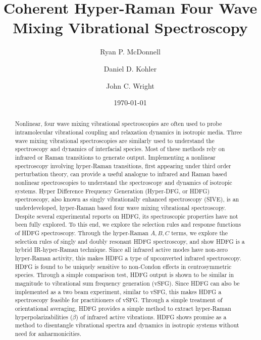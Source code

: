 \documentclass[aip, jcp, reprint, onecolumn]{revtex4-2}
\begin{document}
\title{Coherent Hyper-Raman Four Wave Mixing Vibrational Spectroscopy}


\author{Ryan P. McDonnell} 
\author{Daniel D. Kohler}
\author{John C. Wright} 


\date{\today}

\begin{abstract}
Nonlinear, four wave mixing vibrational spectroscopies are often used to probe intramolecular vibrational coupling and relaxation dynamics in isotropic media.
Three wave mixing vibrational spectroscopies are similarly used to understand the spectroscopy and dynamics of interfacial species.
Most of these methods rely on infrared or Raman transitions to generate output. 
Implementing a nonlinear spectroscopy involving hyper-Raman transitions, first appearing under third order perturbation theory, can provide a useful analogue to infrared and Raman based nonlinear spectroscopies to understand the spectroscopy and dynamics of isotropic systems.
Hyper Difference Frequency Generation (Hyper-DFG, or HDFG) spectroscopy, also known as singly vibrationally enhanced spectroscopy (SIVE), is an underdeveloped, hyper-Raman based four wave mixing vibrational spectroscopy. 
Despite several experimental reports on HDFG, its spectroscopic properties have not been fully explored.
To this end, we explore the selection rules and response functions of HDFG spectroscopy.
Through the hyper-Raman $A,B,C$ terms, we explore the selection rules of singly and doubly resonant HDFG spectroscopy, and show HDFG is a hybrid IR-hyper-Raman technique.
Since all infrared active modes have non-zero hyper-Raman activity, this makes HDFG a type of upconverted infrared spectroscopy.
HDFG is found to be uniquely sensitive to non-Condon effects in centrosymmetric species.
Through a simple comparison test, HDFG output is shown to be similar in magnitude to vibrational sum frequency generation (vSFG).
Since HDFG can also be implemented as a two beam experiment, similar to vSFG, this makes HDFG a spectroscopy feasible for practitioners of vSFG.
Through a simple treatment of orientational averaging, HDFG provides a simple method to extract hyper-Raman hyperpolarizabilities ($\beta$) of infrared active vibrations.
HDFG shows promise as a method to disentangle vibrational spectra and dynamics in isotropic systems without need for anharmonicities.

\end{abstract}
\end{document}
